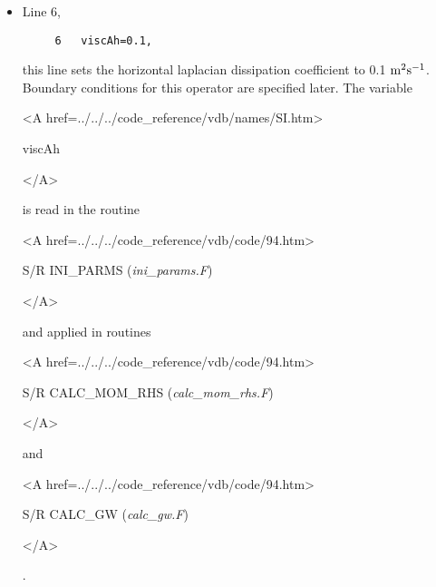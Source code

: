 \begin{itemize}
\item Line 6,
\begin{verbatim}
     6	 viscAh=0.1,
\end{verbatim}
this line sets the horizontal laplacian dissipation coefficient to
0.1 ${\rm m^{2}s^{-1}}$. Boundary conditions
for this operator are specified later. 
The variable 
{\bf 
\begin{rawhtml} <A href=../../../code_reference/vdb/names/SI.htm> \end{rawhtml}
viscAh
\begin{rawhtml} </A>\end{rawhtml}
}
is read in the routine
{\it
\begin{rawhtml} <A href=../../../code_reference/vdb/code/94.htm> \end{rawhtml}
S/R INI\_PARMS ({\it ini\_params.F})
\begin{rawhtml} </A>\end{rawhtml}
} and applied in routines 
{\it 
\begin{rawhtml} <A href=../../../code_reference/vdb/code/94.htm> \end{rawhtml}
S/R CALC\_MOM\_RHS ({\it calc\_mom\_rhs.F})
\begin{rawhtml} </A>\end{rawhtml}
} and 
{\it 
\begin{rawhtml} <A href=../../../code_reference/vdb/code/94.htm> \end{rawhtml}
S/R CALC\_GW ({\it calc\_gw.F})
\begin{rawhtml} </A>\end{rawhtml}
}.



\end{itemize}
